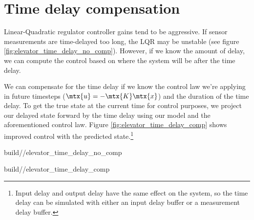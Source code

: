 \section{Time delay compensation}

Linear-Quadratic regulator controller gains tend to be aggressive. If sensor
measurements are time-delayed too long, the LQR may be unstable (see figure
\ref{fig:elevator_time_delay_no_comp}). However, if we know the amount of delay,
we can compute the control based on where the system will be after the time
delay.

We can compensate for the time delay if we know the control law we're applying
in future timesteps ($\mtx{u} = -\mtx{K}\mtx{x}$) and the duration of the time
delay. To get the true state at the current time for control purposes, we
project our delayed state forward by the time delay using our model and the
aforementioned control law. Figure \ref{fig:elevator_time_delay_comp} shows
improved control with the predicted state.\footnote{Input delay and output delay
have the same effect on the system, so the time delay can be simulated with
either an input delay buffer or a measurement delay buffer.}
\begin{bookfigure}
  \begin{minisvg}{2}{build/\chapterpath/elevator_time_delay_no_comp}
    \caption{Elevator response at 5ms sample period with 50ms of output lag}
    \label{fig:elevator_time_delay_no_comp}
  \end{minisvg}
  \hfill
  \begin{minisvg}{2}{build/\chapterpath/elevator_time_delay_comp}
    \caption{Elevator response at 5ms sample period with 50ms of output lag
      (delay-compensated)}
    \label{fig:elevator_time_delay_comp}
  \end{minisvg}
\end{bookfigure}

